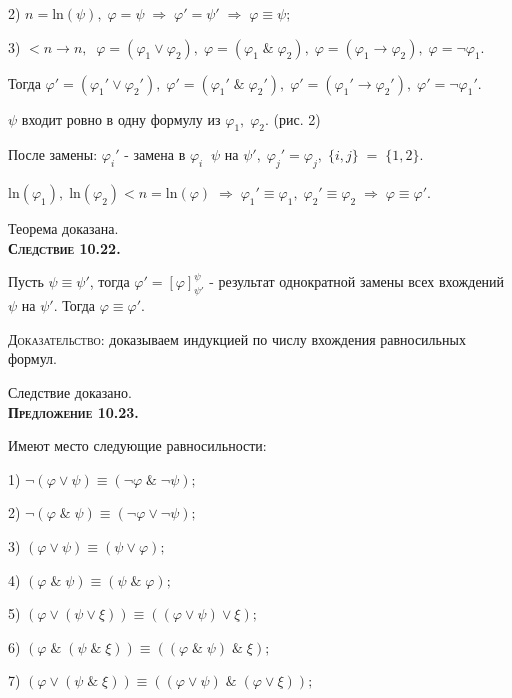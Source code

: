 \documentclass[18pt, a4paper]{extarticle}
\newcommand{\ampersand}{\;\&\;}
\begin{document}
2) \underline{$n=\text{ln}(\psi)$}$,\;\varphi=\psi\;\Rightarrow\;\varphi'=\psi'\;\Rightarrow\;\varphi\equiv\psi;$

3) \underline{\vphantom{$\psi$}$<n\to n$}$,\;\;\varphi=(\varphi_1\vee\varphi_2),\;\varphi=(\varphi_1\ampersand\varphi_2),\;\varphi=(\varphi_1\to\varphi_2),\;\varphi=\lnot\varphi_1$.

Тогда $\varphi'=(\varphi_1'\vee\varphi_2'),\;\varphi'=(\varphi_1'\ampersand\varphi_2'),\;\varphi'=(\varphi_1'\to\varphi_2'),\;\varphi'=\lnot\varphi_1'$.

$\psi$ входит ровно в одну формулу из $\varphi_1,\;\varphi_2$. (рис. 2)

После замены: $\varphi_i'$ -  замена в $\varphi_i\;\;\psi$ на $\psi',\;\varphi_j'=\varphi_j,\;\{i,j\}\;=\;\{1,2\}$.%

$\text{ln}(\varphi_1),\;\text{ln}(\varphi_2)<n=\text{ln}(\varphi)\;\Rightarrow\;\varphi_1'\equiv\varphi_1,\;\varphi_2'\equiv\varphi_2\;\Rightarrow\;\varphi\equiv\varphi'$.

Теорема доказана.\\

\textbf{\textsc{Следствие 10.22.}} 

Пусть $\psi\equiv\psi'$, тогда $\varphi'=[\varphi]_{\psi'}^\psi$ -  результат однократной замены всех вхождений $\psi$ на $\psi'$. Тогда $\varphi\equiv\varphi'$.

\textsc{Доказательство:} доказываем индукцией по числу вхождения равносильных формул. 

Следствие доказано.\\

\textbf{\textsc{Предложение 10.23.}} 

Имеют место следующие равносильности:

1) $\lnot(\varphi\vee\psi)\equiv(\lnot\varphi\ampersand\lnot\psi);$

2) $\lnot(\varphi\ampersand\psi)\equiv(\lnot\varphi\vee\lnot\psi);$

3) $(\varphi\vee\psi)\equiv(\psi\vee\varphi);$

4) $(\varphi\ampersand\psi)\equiv(\psi\ampersand\varphi);$

5) $(\varphi\vee(\psi\vee\xi))\equiv((\varphi\vee\psi)\vee\xi);$

6) $(\varphi\ampersand(\psi\ampersand\xi))\equiv((\varphi\ampersand\psi)\ampersand\xi);$

7) $(\varphi\vee(\psi\ampersand\xi))\equiv((\varphi\vee\psi)\ampersand(\varphi\vee\xi));$
\end{document}
